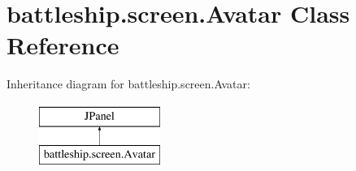 \hypertarget{classbattleship_1_1screen_1_1Avatar}{}\section{battleship.\+screen.\+Avatar Class Reference}
\label{classbattleship_1_1screen_1_1Avatar}
Inheritance diagram for battleship.\+screen.\+Avatar\+:\begin{figure}[H]
\begin{center}
\leavevmode
\includegraphics[height=2.000000cm]{classbattleship_1_1screen_1_1Avatar}
\end{center}
\end{figure}

